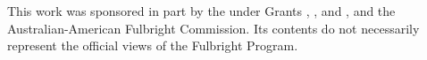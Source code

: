 \documentclass[sigconf]{style/acmart}
\begin{document}


\begin{acks}
This work was sponsored in part by the  under Grants , , and , and the Australian-American Fulbright Commission. Its contents do not necessarily represent the official views of the Fulbright Program.
\end{acks}


 \label{bibliography}


\end{document}
